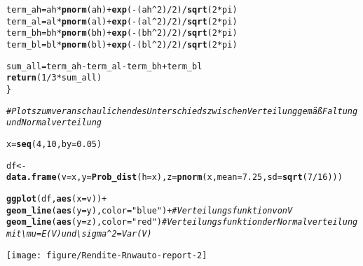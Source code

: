 \documentclass{article}\usepackage[]{graphicx}\usepackage[]{color}
\makeatletter
\newcommand{\hlnum}[1]{\textcolor[rgb]{0.686,0.059,0.569}{#1}}%
\newcommand{\hlstr}[1]{\textcolor[rgb]{0.192,0.494,0.8}{#1}}%
\newcommand{\hlcom}[1]{\textcolor[rgb]{0.678,0.584,0.686}{\textit{#1}}}%
\newcommand{\hlopt}[1]{\textcolor[rgb]{0,0,0}{#1}}%
\newcommand{\hlstd}[1]{\textcolor[rgb]{0.345,0.345,0.345}{#1}}%
\newcommand{\hlkwb}[1]{\textcolor[rgb]{0.69,0.353,0.396}{#1}}%
\newcommand{\hlkwc}[1]{\textcolor[rgb]{0.333,0.667,0.333}{#1}}%
\newcommand{\hlkwd}[1]{\textcolor[rgb]{0.737,0.353,0.396}{\textbf{#1}}}%
\newenvironment{kframe}{%
 \def\at@end@of@kframe{}%
 \ifinner\ifhmode%
  \def\at@end@of@kframe{\end{minipage}}%
  \begin{minipage}{\columnwidth}%
 \fi\fi%
 \def\FrameCommand##1{\hskip\@totalleftmargin \hskip-\fboxsep
 \colorbox{shadecolor}{##1}\hskip-\fboxsep
     \hskip-\linewidth \hskip-\@totalleftmargin \hskip\columnwidth}%
 \MakeFramed {\advance\hsize-\width
   \@totalleftmargin\z@ \linewidth\hsize
   \@setminipage}}%
 {\par\unskip\endMakeFramed%
 \at@end@of@kframe}
\newenvironment{knitrout}{}{} %
\makeatother
\begin{document}
\begin{knitrout}
\begin{kframe}
\begin{alltt}
  \hlstd{term_ah} \hlkwb{=} \hlstd{ah} \hlopt{*} \hlkwd{pnorm}\hlstd{(ah)} \hlopt{+} \hlkwd{exp}\hlstd{(}\hlopt{-}\hlstd{(ah}\hlopt{^}\hlnum{2}\hlstd{)}\hlopt{/}\hlnum{2}\hlstd{)}\hlopt{/}\hlkwd{sqrt}\hlstd{(}\hlnum{2}\hlopt{*}\hlstd{pi)}
  \hlstd{term_al} \hlkwb{=} \hlstd{al} \hlopt{*} \hlkwd{pnorm}\hlstd{(al)} \hlopt{+} \hlkwd{exp}\hlstd{(}\hlopt{-}\hlstd{(al}\hlopt{^}\hlnum{2}\hlstd{)}\hlopt{/}\hlnum{2}\hlstd{)}\hlopt{/}\hlkwd{sqrt}\hlstd{(}\hlnum{2}\hlopt{*}\hlstd{pi)}
  \hlstd{term_bh} \hlkwb{=} \hlstd{bh} \hlopt{*} \hlkwd{pnorm}\hlstd{(bh)} \hlopt{+} \hlkwd{exp}\hlstd{(}\hlopt{-}\hlstd{(bh}\hlopt{^}\hlnum{2}\hlstd{)}\hlopt{/}\hlnum{2}\hlstd{)}\hlopt{/}\hlkwd{sqrt}\hlstd{(}\hlnum{2}\hlopt{*}\hlstd{pi)}
  \hlstd{term_bl} \hlkwb{=} \hlstd{bl} \hlopt{*} \hlkwd{pnorm}\hlstd{(bl)} \hlopt{+} \hlkwd{exp}\hlstd{(}\hlopt{-}\hlstd{(bl}\hlopt{^}\hlnum{2}\hlstd{)}\hlopt{/}\hlnum{2}\hlstd{)}\hlopt{/}\hlkwd{sqrt}\hlstd{(}\hlnum{2}\hlopt{*}\hlstd{pi)}

  \hlstd{sum_all} \hlkwb{=} \hlstd{term_ah} \hlopt{-} \hlstd{term_al} \hlopt{-} \hlstd{term_bh} \hlopt{+} \hlstd{term_bl}
  \hlkwd{return}\hlstd{(}\hlnum{1}\hlopt{/}\hlnum{3} \hlopt{*} \hlstd{sum_all)}
\hlstd{\}}

\hlcom{# Plots zum veranschaulichen des Unterschieds zwischen Verteilung gemäß Faltung und Normalverteilung}

\hlstd{x}\hlkwb{=}\hlkwd{seq}\hlstd{(}\hlnum{4}\hlstd{,}\hlnum{10}\hlstd{,}\hlkwc{by}\hlstd{=}\hlnum{0.05}\hlstd{)}

\hlstd{df} \hlkwb{<-} \hlkwd{data.frame}\hlstd{(}\hlkwc{v}\hlstd{=x,} \hlkwc{y} \hlstd{=} \hlkwd{Prob_dist}\hlstd{(}\hlkwc{h}\hlstd{=x),} \hlkwc{z} \hlstd{=}  \hlkwd{pnorm}\hlstd{(x,}\hlkwc{mean}\hlstd{=} \hlnum{7.25}\hlstd{,}\hlkwc{sd} \hlstd{=} \hlkwd{sqrt}\hlstd{(}\hlnum{7}\hlopt{/}\hlnum{16}\hlstd{)) )}

\hlkwd{ggplot}\hlstd{(df,} \hlkwd{aes}\hlstd{(}\hlkwc{x}\hlstd{=v))}\hlopt{+}
  \hlkwd{geom_line}\hlstd{(}\hlkwd{aes}\hlstd{(}\hlkwc{y}\hlstd{=y),}\hlkwc{color} \hlstd{=} \hlstr{"blue"}\hlstd{)}\hlopt{+} \hlcom{#Verteilungsfunktion von V}
  \hlkwd{geom_line}\hlstd{(}\hlkwd{aes}\hlstd{(}\hlkwc{y}\hlstd{=z),}\hlkwc{color} \hlstd{=} \hlstr{"red"}\hlstd{)}   \hlcom{#Verteilungsfunktion der Normalverteilung mit \textbackslash{}mu = E(V) und \textbackslash{}sigma^2 = Var(V)}
\end{alltt}
\end{kframe}

{\centering \texttt{[image: figure/Rendite-Rnwauto-report-2]} 

}
\end{knitrout}
\end{document}
